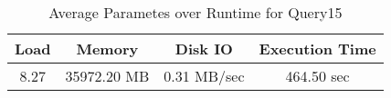 \documentclass[../../main.tex]{subfiles}
\begin{document}
\begin{minipage}{.5\textwidth}
    \end{minipage}
    \begin{table}
        \begin{center}
            \begin{tabular}{ |c|c|c|c| } 
            \hline
            Load & Memory & Disk IO & Execution Time\\
            \hline
            8.27 & 35972.20 MB & 0.31 MB/sec & 464.50 sec \\
            \hline
            \end{tabular}
            \\[1pt]
            \caption{Average Parametes over Runtime for Query15}
        \end{center}
    \end{table}
    \pagebreak
\end{document}
